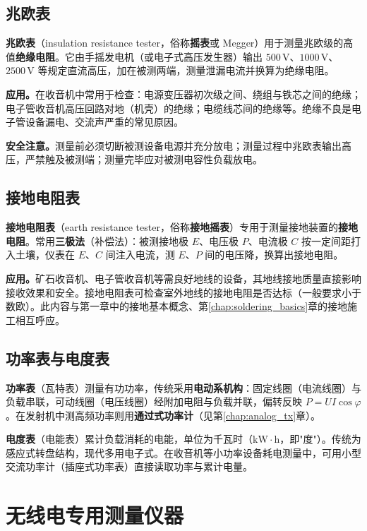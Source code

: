 \documentclass[12pt,UTF8]{ctexbook}
\begin{document}
\subsection{兆欧表}

\textbf{兆欧表}（insulation resistance tester，俗称\textbf{摇表}或 Megger）用于测量兆欧级的高值\textbf{绝缘电阻}。它由手摇发电机（或电子式高压发生器）输出 $500\,\mathrm{V}$、$1000\,\mathrm{V}$、$2500\,\mathrm{V}$ 等规定直流高压，加在被测两端，测量泄漏电流并换算为绝缘电阻。

\textbf{应用。}在收音机中常用于检查：电源变压器初次级之间、绕组与铁芯之间的绝缘；电子管收音机高压回路对地（机壳）的绝缘；电缆线芯间的绝缘等。绝缘不良是电子管设备漏电、交流声严重的常见原因。

\textbf{安全注意。}测量前必须切断被测设备电源并充分放电；测量过程中兆欧表输出高压，严禁触及被测端；测量完毕应对被测电容性负载放电。

\subsection{接地电阻表}

\textbf{接地电阻表}（earth resistance tester，俗称\textbf{接地摇表}）专用于测量接地装置的\textbf{接地电阻}。常用\textbf{三极法}（补偿法）：被测接地极 $E$、电压极 $P$、电流极 $C$ 按一定间距打入土壤，仪表在 $E$、$C$ 间注入电流，测 $E$、$P$ 间的电压降，换算出接地电阻。

\textbf{应用。}矿石收音机、电子管收音机等需良好地线的设备，其地线接地质量直接影响接收效果和安全。接地电阻表可检查室外地线的接地电阻是否达标（一般要求小于数欧）。此内容与第一章中的接地基本概念、第\ref{chap:soldering_basics}章的接地施工相互呼应。

\subsection{功率表与电度表}

\textbf{功率表}（瓦特表）测量有功功率，传统采用\textbf{电动系机构}：固定线圈（电流线圈）与负载串联，可动线圈（电压线圈）经附加电阻与负载并联，偏转反映 $P=UI\cos\varphi$。在发射机中测高频功率则用\textbf{通过式功率计}（见第\ref{chap:analog_tx}章）。

\textbf{电度表}（电能表）累计负载消耗的电能，单位为千瓦时（$\mathrm{kW\cdot h}$，即"度"）。传统为感应式转盘结构，现代多用电子式。在收音机等小功率设备耗电测量中，可用小型交流功率计（插座式功率表）直接读取功率与累计电量。

\section{无线电专用测量仪器}
\label{sec:radio_instruments}
\end{document}
